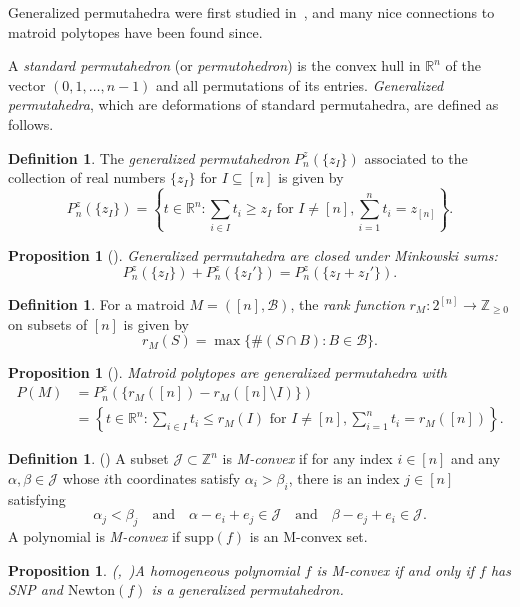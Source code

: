 \documentclass[11pt]{article}
\newtheorem{prop}[theo]{Proposition}
\theoremstyle{definition}
\newtheorem{defi}[theo]{Definition}
\numberwithin{equation}{section}
\newcommand{\B}{\mathcal{B}}
\newcommand{\Newton}{\mathrm{Newton}}
\newcommand{\R}{\mathbb{R}}
\newcommand{\supp}{\mathrm{supp}}
\newcommand{\ZZ}{\mathbb{Z}}
\begin{document}
Generalized permutahedra were first studied in~\cite{postnikovpermutohedra}, and many nice connections to matroid polytopes have been found since.

A \emph{standard permutahedron} (or \emph{permutohedron}) is the convex hull in $\R^n$ of the vector $(0, 1, \dots, n-1)$ and all permutations of its entries. \emph{Generalized permutahedra}, which are deformations of standard permutahedra, are defined as follows.

\begin{defi}
    The \emph{generalized permutahedron} $P_n^z(\{z_I\})$ associated to the collection of real numbers $\{z_I\}$ for $I\subseteq [n]$ is given by
    \[P_n^z(\{z_I\}) = \left\{t\in\R^n : \sum_{i\in I} t_i\ge z_I \text{ for } I\neq [n], \sum_{i=1}^n t_i = z_{[n]}\right\}.\]
\end{defi}

\begin{prop}[\cite{MatroidPolytopes}]\label{prop:permutahedraminkowskisum}
    Generalized permutahedra are closed under Minkowski sums:
    \[P_n^z(\{z_I\}) + P_n^z(\{z_I'\}) = P_n^z(\{z_I + z_I'\}).\]
\end{prop}

\begin{defi}\label{def:rankfunction}
    For a matroid $M = ([n], \B)$, the \emph{rank function} $r_M: 2^{[n]}\to\ZZ_{\ge 0}$ on subsets of $[n]$ is given by
    \[r_M(S) = \max\{\#(S\cap B) : B\in\B\}.\]
\end{defi}

\begin{prop}[\cite{MatroidPolytopes}]\label{prop:matroidsarepermutahedra}
    Matroid polytopes are generalized permutahedra with
    \begin{align*}
        P(M) &= P_n^z(\{r_M([n]) - r_M([n]\setminus I)\})\\
        &= \left\{t\in\R^n : \sum_{i\in I} t_i\le r_M(I) \text{ for } I\neq [n], \sum_{i=1}^n t_i = r_M([n])\right\}.
    \end{align*}
\end{prop}

\begin{defi}(\cite{DicreteConvexAnaly})
A subset $\mathcal{J} \subset \ZZ^n$ is \emph{M-convex} if for any index $i \in [n]$ and any $\alpha, \beta \in \mathcal{J}$ whose $i$th coordinates satisfy $\alpha_i > \beta_i$, there is an index $j \in [n]$ satisfying
\[
\alpha_j < \beta_j \quad \text{and} \quad \alpha - e_i + e_j \in \mathcal{J} \quad \text{and} \quad \beta - e_j + e_i \in \mathcal{J}.
\]
    A polynomial is \emph{M-convex} if $\supp(f)$ is an M-convex set.
\end{defi}
\begin{prop}\textup{(}\cite[Theorem 4.15]{DicreteConvexAnaly},~\cite{HuhMeszaroLorSchur}\textup{)}\label{prop:Mconvex=SNP+GP}
    A homogeneous polynomial $f$ is M-convex if and only if $f$ has SNP and $\Newton(f)$ is a generalized permutahedron.
\end{prop}
\end{document}
